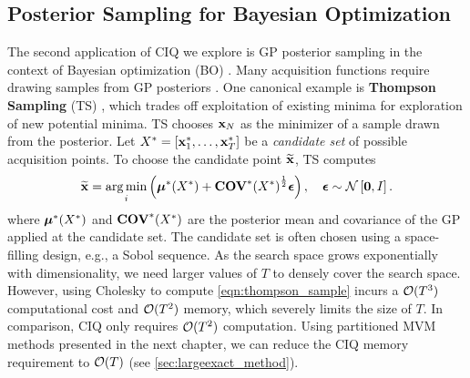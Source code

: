 \subsection{Posterior Sampling for Bayesian Optimization}
\label{sec:bayesopt_results}

The second application of CIQ we explore is GP posterior sampling in the context of Bayesian optimization (BO) \citep[e.g.][]{snoek2012practical}.
Many acquisition functions require drawing samples from GP posteriors \citep[e.g.][]{frazier2009knowledge,hernandez2014predictive,wang2017max}.
One canonical example is {\bf Thompson Sampling} (TS) \cite{thompson1933likelihood, hernandez2017parallel, kandasamy2018parallelised},
which trades off exploitation of existing minima for exploration of new potential minima.
TS chooses $\mathbf{x}_N$ as the minimizer of a sample drawn from the posterior.
Let $X^* = [ \mathbf{x}^*_1, \ldots, \mathbf{x}^*_T ]$ be a \emph{candidate set} of possible acquisition points.
To choose the candidate point $\widetilde {\mathbf{x}}$, TS computes
%
\begin{equation}
  \widetilde \bx = \argmin_{i} \left( \bmeantest(\bXtest) + {\Covtest(\bXtest)}^{\frac 1 2} \bepsilon \right),
  \quad
  \bepsilon \sim \normaldist{\bzero}{\bI}.
  \label{eqn:thompson_sample}
\end{equation}
%
where $\boldsymbol{\mu}^*(X^*)$ and $\textbf{COV}^*(X^*)$ are the posterior mean and covariance of the GP applied at the candidate set.
The candidate set is often chosen using a space-filling design, e.g., a Sobol sequence.
As the search space grows exponentially with dimensionality, we need larger values of $T$ to densely cover the search space.
However, using Cholesky to compute \cref{eqn:thompson_sample} incurs a $\bigo{T^3}$ computational cost and $\bigo{T^2}$ memory, which severely limits the size of $T$.
In comparison, CIQ only requires $\bigo{T^2}$ computation.
Using partitioned MVM methods presented in the next chapter, we can reduce the CIQ memory requirement to $\bigo{T}$ (see \cref{sec:largeexact_method}).

